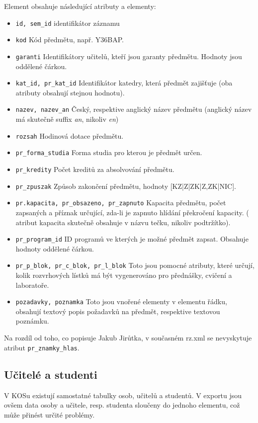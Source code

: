 \documentclass[11pt,twoside,a4paper]{book}
\begin{document}
Element obsahuje následující atributy a elementy:

\begin{itemize}
\item \texttt{id, sem\_id} identifikátor záznamu
\item \texttt{kod} Kód předmětu, např. Y36BAP.
\item \texttt{garanti} Identifikátory učitelů, kteří jsou garanty předmětu. Hodnoty jsou oddělené čárkou.
\item \texttt{kat\_id, pr\_kat\_id} Identifikátor katedry, která předmět zajišťuje (oba atributy obsahují stejnou hodnotu).
\item \texttt{nazev, nazev\_an} Český, respektive anglický název předmětu (anglický název má skutečně suffix \textit{an}, nikoliv \textit{en})
\item \texttt{rozsah} Hodinová dotace předmětu.
\item \texttt{pr\_forma\_studia} Forma studia pro kterou je předmět určen.
\item \texttt{pr\_kredity} Počet kreditů za absolvování předmětu.
\item \texttt{pr\_zpuszak} Způsob zakončení předmětu, hodnoty [KZ|Z|ZK|Z,ZK|NIC].
\item \texttt{pr.kapacita, pr\_obsazeno, pr\_zapnuto} Kapacita předmětu, počet zapsaných a příznak určující, zda-li je zapnuto hlídání překročení kapacity. ( atribut kapacita skutečně obsahuje v názvu tečku, nikoliv podtržítko).
\item \texttt{pr\_program\_id} ID programů ve kterých je možné předmět zapsat. Obsahuje hodnoty oddělené čárkou.
\item \texttt{pr\_p\_blok, pr\_c\_blok, pr\_l\_blok} Toto jsou pomocné atributy, které určují, kolik rozvrhových lístků má být vygenerováno pro přednášky, cvičení a laboratoře.
\item \texttt{pozadavky, poznamka} Toto jsou vnořené elementy v elementu řádku, obsahují textový popis požadavků na předmět, respektive textovou poznámku.
\end{itemize}
Na rozdíl od toho, co popisuje Jakub Jirůtka, v současném rz.xml se nevyskytuje atribut \texttt{pr\_znamky\_hlas}.

\subsection{Učitelé a studenti}
V KOSu existují samostatné tabulky osob, učitelů a studentů. V exportu jsou ovšem data osoby a učitele, resp. studenta sloučeny do jednoho elementu, což může přinést určité problémy.
\end{document}

